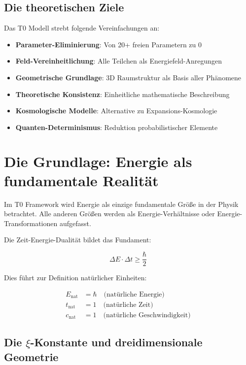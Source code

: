 	\subsection{Die theoretischen Ziele}
	
	Das T0 Modell strebt folgende Vereinfachungen an:
	
	\begin{itemize}
		\item \textbf{Parameter-Eliminierung}: Von 20+ freien Parametern zu 0
		\item \textbf{Feld-Vereinheitlichung}: Alle Teilchen als Energiefeld-Anregungen
		\item \textbf{Geometrische Grundlage}: 3D Raumstruktur als Basis aller Phänomene
		\item \textbf{Theoretische Konsistenz}: Einheitliche mathematische Beschreibung
		\item \textbf{Kosmologische Modelle}: Alternative zu Expansions-Kosmologie
		\item \textbf{Quanten-Determinismus}: Reduktion probabilistischer Elemente
	\end{itemize}
	
	
	\section{Die Grundlage: Energie als fundamentale Realität}
	
	\begin{prinzip}
		Im T0 Framework wird Energie als einzige fundamentale Größe in der Physik betrachtet. Alle anderen Größen werden als Energie-Verhältnisse oder Energie-Transformationen aufgefasst.
	\end{prinzip}
	
	Die Zeit-Energie-Dualität bildet das Fundament:
	
	\begin{equation}
		\Delta E \cdot \Delta t \geq \frac{\hbar}{2}
	\end{equation}
	
	Dies führt zur Definition natürlicher Einheiten:
	
	\begin{align}
		E_{\text{nat}} &= \hbar \quad \text{(natürliche Energie)} \\
		t_{\text{nat}} &= 1 \quad \text{(natürliche Zeit)} \\
		c_{\text{nat}} &= 1 \quad \text{(natürliche Geschwindigkeit)}
	\end{align}
	
	\subsection{Die $\xi$-Konstante und dreidimensionale Geometrie}
	
